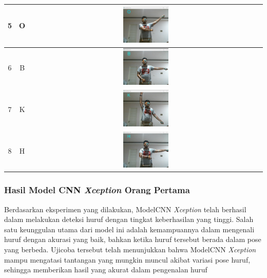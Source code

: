 \begin{table}[!hbt]
\begin{tabular}{|c|c|c|}
	\hline
	5 & O & \includegraphics[width=0.2\textwidth]{gambar/bener/HurufO_ModelCNNResNet50V2_Dawe.png} \\
	\hline
	6 & B & \includegraphics[width=0.2\textwidth]{gambar/bener/HurufB_ModelCNNResNet50V2_Dawe.png} \\
	\hline
	7 & K & \includegraphics[width=0.2\textwidth]{gambar/bener/HurufK_ModelCNNResNet50V2_Dawe.png} \\
	\hline
	8 & H & \includegraphics[width=0.2\textwidth]{gambar/bener/HurufH_ModelCNNResNet50V2_Dawe.png} \\
	\hline
	\end{tabular}
\end{table}


\subsubsection*{Hasil Model CNN \textit{Xception} Orang Pertama}
Berdasarkan eksperimen yang dilakukan, ModelCNN \textit{Xception} telah berhasil dalam melakukan deteksi huruf dengan tingkat keberhasilan yang tinggi. Salah satu keunggulan utama dari model ini adalah kemampuannya dalam mengenali huruf dengan akurasi yang baik, bahkan ketika huruf tersebut berada dalam pose yang berbeda. Ujicoba tersebut telah menunjukkan bahwa ModelCNN \textit{Xception} mampu mengatasi tantangan yang mungkin muncul akibat variasi pose huruf, sehingga memberikan hasil yang akurat dalam pengenalan huruf

